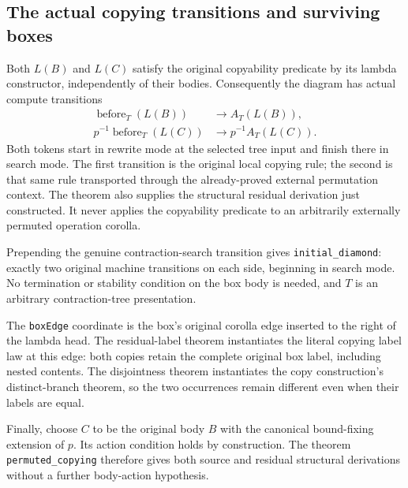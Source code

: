 \subsection{The actual copying transitions and surviving boxes}
Both $L(B)$ and $L(C)$ satisfy the original copyability predicate by its lambda
constructor, independently of their bodies. Consequently the diagram has actual
compute transitions
\[
 \begin{aligned}
  \operatorname{before}_T(L(B))&\longrightarrow A_T(L(B)),\\
  p^{-1}\operatorname{before}_T(L(C))&\longrightarrow p^{-1}A_T(L(C)).
 \end{aligned}
\]
Both tokens start in rewrite mode at the selected tree input and finish there
in search mode. The first transition is the original local copying rule;
the second is that same rule transported through the already-proved external
permutation context. The theorem also supplies the structural residual
derivation just constructed. It never applies the copyability predicate to an
arbitrarily externally permuted operation corolla.

Prepending the genuine contraction-search transition gives
\texttt{initial\_diamond}: exactly two original machine transitions on each
side, beginning in search mode. No termination or stability condition on the
box body is needed, and $T$ is an arbitrary contraction-tree presentation.


The \texttt{boxEdge} coordinate is the box's original corolla edge inserted to
the right of the lambda head. The residual-label theorem instantiates the
literal copying label law at this edge: both copies retain the complete original
box label, including nested contents. The disjointness theorem instantiates the
copy construction's distinct-branch theorem, so the two occurrences remain
different even when their labels are equal.

Finally, choose $C$ to be the original body $B$ with the canonical bound-fixing
extension of $p$. Its action condition holds by construction. The theorem
\texttt{permuted\_copying} therefore gives both source and residual structural
derivations without a further body-action hypothesis.


